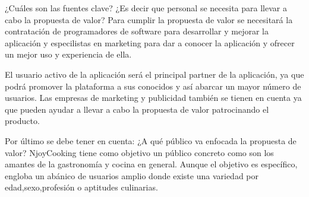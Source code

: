 \vspace{5 mm}

¿Cuáles son las fuentes clave? ¿Es decir que personal se necesita para llevar a cabo la propuesta de valor? Para cumplir la propuesta de valor
se necesitará la contratación de programadores de software para desarrollar y mejorar la aplicación y especilistas en marketing para dar a conocer
la aplicación y ofrecer un mejor uso y experiencia de ella.

\vspace{5 mm}

El usuario activo de la aplicación será el principal partner de la aplicación, ya que podrá promover la plataforma a sus conocidos y así abarcar un
mayor número de usuarios. Las empresas de marketing y publicidad también se tienen en cuenta ya que pueden ayudar a llevar a cabo la propuesta de
valor patrocinando el producto.


\vspace{5 mm}

Por último se debe tener en cuenta: ¿A qué público va enfocada la propuesta de valor? NjoyCooking tiene como objetivo un público concreto como son los amantes de la gastronomía y cocina en general. Aunque el objetivo es específico, engloba un abánico de usuarios amplio donde existe una variedad por edad,sexo,profesión o aptitudes culinarias.
